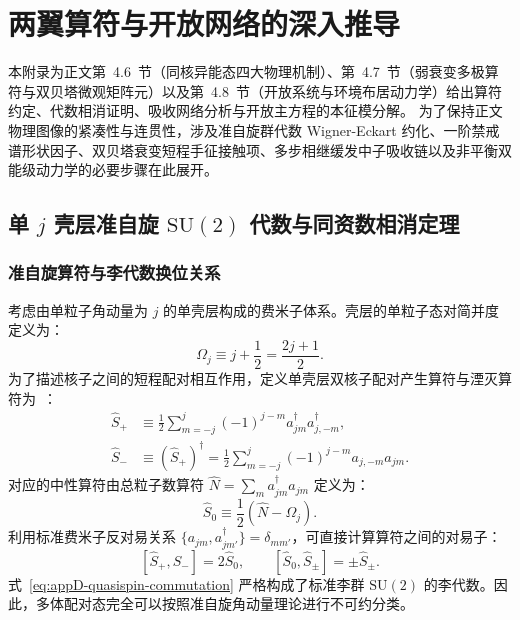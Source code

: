 \chapter{两翼算符与开放网络的深入推导}\label{app:wing-operators-networks}

本附录为正文第~4.6~节（同核异能态四大物理机制）、第~4.7~节（弱衰变多极算符与双贝塔微观矩阵元）以及第~4.8~节（开放系统与环境布居动力学）给出算符约定、代数相消证明、吸收网络分析与开放主方程的本征模分解。
为了保持正文物理图像的紧凑性与连贯性，涉及准自旋群代数 Wigner-Eckart 约化、一阶禁戒谱形状因子、双贝塔衰变短程手征接触项、多步相继缓发中子吸收链以及非平衡双能级动力学的必要步骤在此展开。

\section{单 $j$ 壳层准自旋 $\mathrm{SU}(2)$ 代数与同资数相消定理}\label{sec:appD-seniority-quasispin}

\subsection{准自旋算符与李代数换位关系}

考虑由单粒子角动量为 $j$ 的单壳层构成的费米子体系。壳层的单粒子态对简并度定义为：
\begin{equation}\label{eq:appD-omega-def}
\Omega_j \equiv j + \frac{1}{2} = \frac{2j + 1}{2}.
\end{equation}
为了描述核子之间的短程配对相互作用，定义单壳层双核子配对产生算符与湮灭算符为~\cite{book-jain-nuclear-isomers, book-suhonen-from-nucleons-to-nucleus}：
\begin{align}
\hat{S}_+ &\equiv \frac{1}{2} \sum_{m=-j}^j (-1)^{j-m} a_{jm}^\dagger a_{j,-m}^\dagger, \label{eq:appD-splus-def} \\
\hat{S}_- &\equiv (\hat{S}_+)^\dagger = \frac{1}{2} \sum_{m=-j}^j (-1)^{j-m} a_{j,-m} a_{jm}. \label{eq:appD-sminus-def}
\end{align}
对应的中性算符由总粒子数算符 $\hat{N} = \sum_m a_{jm}^\dagger a_{jm}$ 定义为：
\begin{equation}\label{eq:appD-szero-def}
\hat{S}_0 \equiv \frac{1}{2} \left( \hat{N} - \Omega_j \right).
\end{equation}
利用标准费米子反对易关系 $\{a_{jm}, a_{jm'}^\dagger\} = \delta_{mm'}$，可直接计算算符之间的对易子：
\begin{equation}\label{eq:appD-quasispin-commutation}
[\hat{S}_+, \hat{S}_-] = 2 \hat{S}_0, \qquad [\hat{S}_0, \hat{S}_\pm] = \pm \hat{S}_\pm.
\end{equation}
式~\eqref{eq:appD-quasispin-commutation} 严格构成了标准李群 $\mathrm{SU}(2)$ 的李代数。因此，多体配对态完全可以按照准自旋角动量理论进行不可约分类。

